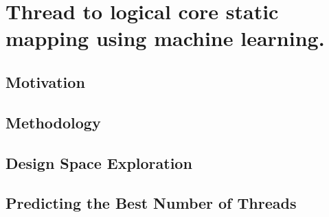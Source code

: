 %
%
%
%
%
%
%

\chapter{Thread to logical core static mapping using machine learning.}

\label{sec:intro}


%

\section{Motivation}
\label{sec:motiviation}


\section{Methodology}
\label{sec:setup}


\section{Design Space Exploration}
\label{sec:streamit:dse}


\label{sec:ml}
\section{Predicting the Best Number of Threads}

